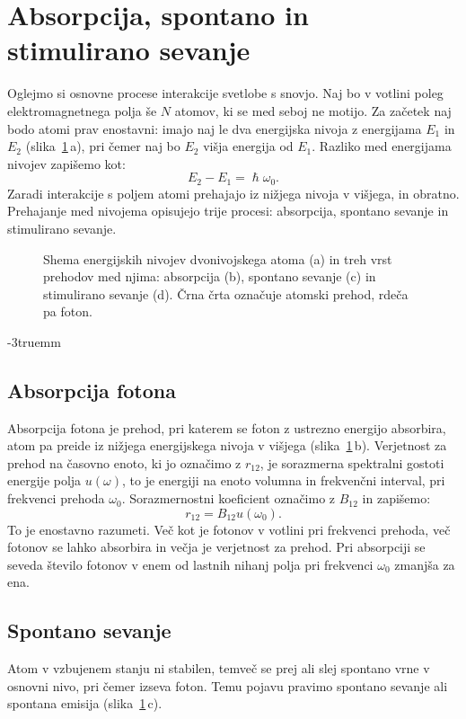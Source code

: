 \section{Absorpcija, spontano in stimulirano sevanje}
\label{chap:ASSS}
Oglejmo si osnovne procese interakcije svetlobe s snovjo. Naj
bo v votlini poleg elektro\-mag\-net\-nega polja še $N$ atomov, ki se med
seboj ne motijo. Za začetek naj bodo atomi prav enostavni:
imajo naj le dva energijska nivoja z energijama $E_{1}$ in $E_{2}$ (slika~\ref{sl4.1}\,a),
pri čemer naj bo $E_2$ višja energija od $E_1$. Razliko med energijama nivojev zapišemo kot: 
\begin{equation}
 E_2 - E_1 = \hslash \omega_0.
\end{equation}
Zaradi interakcije s poljem
atomi prehajajo iz nižjega nivoja v višjega, in obratno. Prehajanje 
med nivojema opisujejo trije procesi: 
absorpcija, spontano sevanje in stimulirano sevanje.
\begin{figure}[ht]
\centering
\def\svgwidth{120truemm} 

\caption{Shema energijskih nivojev dvonivojskega atoma 
(a) in treh vrst prehodov med njima:
absorpcija (b), spontano sevanje (c) in stimulirano sevanje (d). Črna črta označuje atomski
prehod, rdeča pa foton.}
\label{sl4.1}
\end{figure}
\vglue-3truemm
\subsection*{Absorpcija fotona}
Absorpcija fotona je prehod, pri katerem se foton 
z ustrezno energijo absorbira, atom pa preide iz nižjega energijskega nivoja 
v višjega (slika~\ref{sl4.1}\,b). 
Verjetnost za prehod na časovno enoto, 
ki jo označimo z $r_{12}$, 
je sorazmerna spektralni gostoti energije polja 
$u(\omega)$, 
to je energiji na enoto volumna in frekvenčni interval, 
pri frekvenci prehoda $\omega_{0}$.
Sorazmernostni koeficient označimo z $B_{12}$ in 
zapišemo:
\begin{equation}
r_{12}=B_{12}u(\omega_{0}).
\label{4.16}
\end{equation}
To je enostavno razumeti. Več kot je fotonov v votlini pri frekvenci prehoda, 
več fotonov se lahko absorbira in večja je verjetnost za prehod. Pri absorpciji se
seveda število fotonov v enem od lastnih nihanj polja pri frekvenci
$\omega_{0}$ zmanjša za ena.

\subsection*{Spontano sevanje}
Atom v vzbujenem stanju ni stabilen, temveč se prej ali slej spontano vrne 
v osnovni nivo, pri čemer izseva foton. Temu pojavu pravimo spontano sevanje 
ali spontana emisija (slika~\ref{sl4.1}\,c).

